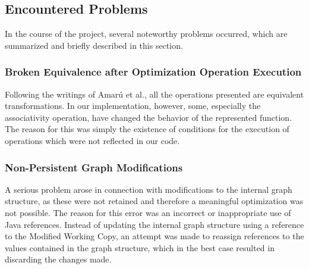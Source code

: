 \documentclass[
	accentcolor=1c,%
	type=intern,
	marginpar=false,
	ruledheaders=section,
	class=report,
	BCOR=5mm,
      parskip=half-,
	fontsize=10pt
	]{tudapub}
\begin{document}
	\subsection{Encountered Problems}
		In the course of the project, several noteworthy problems occurred, which are summarized and briefly described in this section.
		\subsubsection{Broken Equivalence after Optimization Operation Execution}
			Following the writings of Amarú et al., all the operations presented are equivalent transformations.
			In our implementation, however, some, especially the associativity operation, have changed the behavior of the represented function.
			The reason for this was simply the existence of conditions for the execution of operations which were not reflected in our code.

		\subsubsection{Non-Persistent Graph Modifications}
			A serious problem arose in connection with modifications to the internal graph structure, as these were not retained and therefore a meaningful optimization was not possible.
			The reason for this error was an incorrect or inappropriate use of Java references.
			Instead of updating the internal graph structure using a reference to the Modified Working Copy, an attempt was made to reassign references to the values contained in the graph structure, which in the best case resulted in discarding the changes made.

%
\end{document}

